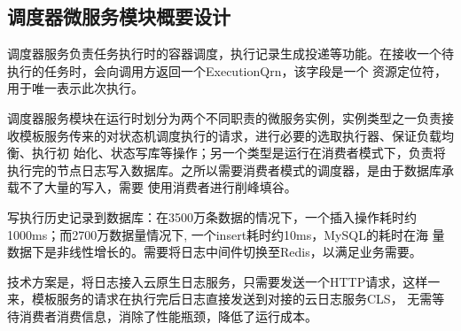 \subsection{调度器微服务模块概要设计}
调度器服务负责任务执行时的容器调度，执行记录生成投递等功能。在接收一个待执行的任务时，会向调用方返回一个ExecutionQrn，该字段是一个
资源定位符，用于唯一表示此次执行。

调度器服务模块在运行时划分为两个不同职责的微服务实例，实例类型之一负责接收模板服务传来的对状态机调度执行的请求，进行必要的选取执行器、保证负载均衡、执行初
始化、状态写库等操作；另一个类型是运行在消费者模式下，负责将执行完的节点日志写入数据库。之所以需要消费者模式的调度器，是由于数据库承载不了大量的写入，需要
使用消费者进行削峰填谷。

写执行历史记录到数据库：在3500万条数据的情况下，一个插入操作耗时约1000ms；而2700万数据量情况下, 一个insert耗时约10ms，MySQL的耗时在海
量数据下是非线性增长的。需要将日志中间件切换至Redis，以满足业务需要。

技术方案是，将日志接入云原生日志服务，只需要发送一个HTTP请求，这样一来，模板服务的请求在执行完后日志直接发送到对接的云日志服务CLS，
无需等待消费者消费信息，消除了性能瓶颈，降低了运行成本。


